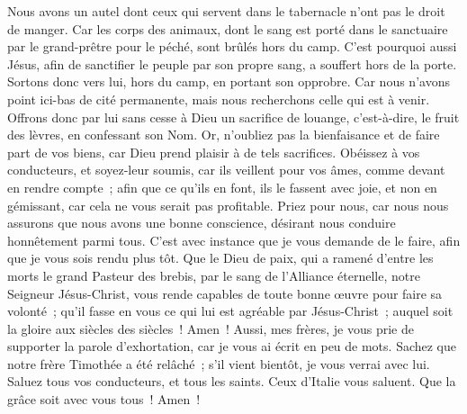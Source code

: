 \begin{multicols}{2}
Nous avons un autel dont ceux qui servent dans le tabernacle n'ont pas le droit de manger.
Car les corps des animaux, dont le sang est porté dans le sanctuaire par le grand-prêtre pour le péché, sont brûlés hors du camp.
C'est pourquoi aussi Jésus, afin de sanctifier le peuple par son propre sang, a souffert hors de la porte.
Sortons donc vers lui, hors du camp, en portant son opprobre.
Car nous n'avons point ici-bas de cité permanente, mais nous recherchons celle qui est à venir.
Offrons donc par lui sans cesse à Dieu un sacrifice de louange, c'est-à-dire, le fruit des lèvres, en confessant son Nom.
Or, n'oubliez pas la bienfaisance et de faire part de vos biens, car Dieu prend plaisir à de tels sacrifices.
Obéissez à vos conducteurs, et soyez-leur soumis, car ils veillent pour vos âmes, comme devant en rendre compte~; afin que ce qu'ils en font, ils le fassent avec joie, et non en gémissant, car cela ne vous serait pas profitable.
 Priez pour nous, car nous nous assurons que nous avons une bonne conscience, désirant nous conduire honnêtement parmi tous.
C'est avec instance que je vous demande de le faire, afin que je vous sois rendu plus tôt.
Que le Dieu de paix, qui a ramené d'entre les morts le grand Pasteur des brebis, par le sang de l'Alliance éternelle, notre Seigneur Jésus-Christ,
vous rende capables de toute bonne œuvre pour faire sa volonté~; qu'il fasse en vous ce qui lui est agréable par Jésus-Christ~; auquel soit la gloire aux siècles des siècles~! Amen~!
Aussi, mes frères, je vous prie de supporter la parole d'exhortation, car je vous ai écrit en peu de mots.
Sachez que notre frère Timothée a été relâché~; s'il vient bientôt, je vous verrai avec lui.
Saluez tous vos conducteurs, et tous les saints. Ceux d'Italie vous saluent.
Que la grâce soit avec vous tous~! Amen~!
\PPE{}
\end{multicols}
